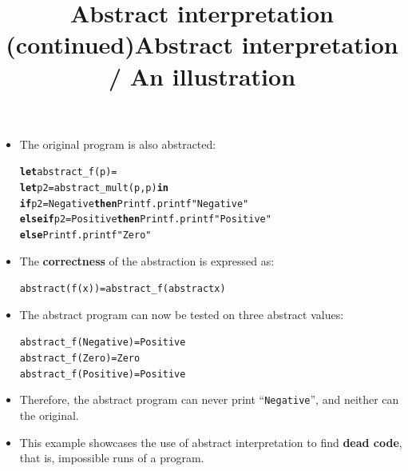 \documentclass[wide]{slides}
\begin{document}
\begin{slide}
  \title{Abstract interpretation (continued)}

  \begin{itemize}

      \item The original program is also abstracted:
\begin{alltt}

\textbf{let} abstract\_f (p) =
  \textbf{let} p2 = abstract\_mult (p,p) \textbf{in}
  \textbf{if} p2 = Negative \textbf{then} Printf.printf "Negative"
  \textbf{else} \textbf{if} p2 = Positive \textbf{then} Printf.printf "Positive"
        \textbf{else} Printf.printf "Zero"

\end{alltt}

    \item The \textbf{correctness} of the abstraction is expressed as:
      \begin{alltt}

abstract (f (x)) = abstract\_f (abstract x)

      \end{alltt}

  \end{itemize}

\end{slide}

\begin{slide}
  \title{Abstract interpretation / An illustration}

  \begin{itemize}

    \item The abstract program can now be tested on three abstract
      values:
\begin{alltt}
abstract\_f (Negative) = Positive
abstract\_f (Zero)      = Zero
abstract\_f (Positive) = Positive
\end{alltt}

    \item Therefore, the abstract program can never print
      ``\texttt{Negative}'', and neither can the original.

    \item This example showcases the use of abstract interpretation to
      find \textbf{dead code}, that is, impossible runs of a program.

  \end{itemize}

\end{slide}
\end{document}
